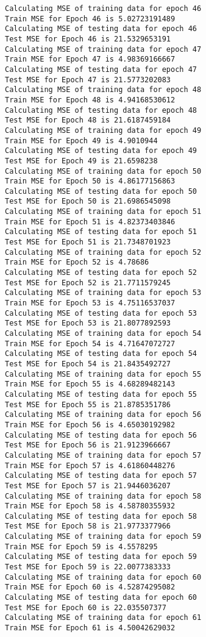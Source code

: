 \documentclass{article}
\begin{document}
\begin{Verbatim}[commandchars=\\\{\}]
Calculating MSE of training data for epoch 46
Train MSE for Epoch 46 is 5.02723191489
Calculating MSE of testing data for epoch 46
Test MSE for Epoch 46 is 21.5329653191
Calculating MSE of training data for epoch 47
Train MSE for Epoch 47 is 4.98369166667
Calculating MSE of testing data for epoch 47
Test MSE for Epoch 47 is 21.5773202083
Calculating MSE of training data for epoch 48
Train MSE for Epoch 48 is 4.94168530612
Calculating MSE of testing data for epoch 48
Test MSE for Epoch 48 is 21.6187459184
Calculating MSE of training data for epoch 49
Train MSE for Epoch 49 is 4.9010944
Calculating MSE of testing data for epoch 49
Test MSE for Epoch 49 is 21.6598238
Calculating MSE of training data for epoch 50
Train MSE for Epoch 50 is 4.86177156863
Calculating MSE of testing data for epoch 50
Test MSE for Epoch 50 is 21.6986545098
Calculating MSE of training data for epoch 51
Train MSE for Epoch 51 is 4.82373403846
Calculating MSE of testing data for epoch 51
Test MSE for Epoch 51 is 21.7348701923
Calculating MSE of training data for epoch 52
Train MSE for Epoch 52 is 4.78686
Calculating MSE of testing data for epoch 52
Test MSE for Epoch 52 is 21.7711579245
Calculating MSE of training data for epoch 53
Train MSE for Epoch 53 is 4.75116537037
Calculating MSE of testing data for epoch 53
Test MSE for Epoch 53 is 21.8077892593
Calculating MSE of training data for epoch 54
Train MSE for Epoch 54 is 4.71647072727
Calculating MSE of testing data for epoch 54
Test MSE for Epoch 54 is 21.8435492727
Calculating MSE of training data for epoch 55
Train MSE for Epoch 55 is 4.68289482143
Calculating MSE of testing data for epoch 55
Test MSE for Epoch 55 is 21.8785351786
Calculating MSE of training data for epoch 56
Train MSE for Epoch 56 is 4.65030192982
Calculating MSE of testing data for epoch 56
Test MSE for Epoch 56 is 21.9123966667
Calculating MSE of training data for epoch 57
Train MSE for Epoch 57 is 4.61860448276
Calculating MSE of testing data for epoch 57
Test MSE for Epoch 57 is 21.9446036207
Calculating MSE of training data for epoch 58
Train MSE for Epoch 58 is 4.58780355932
Calculating MSE of testing data for epoch 58
Test MSE for Epoch 58 is 21.9773377966
Calculating MSE of training data for epoch 59
Train MSE for Epoch 59 is 4.5578295
Calculating MSE of testing data for epoch 59
Test MSE for Epoch 59 is 22.0077383333
Calculating MSE of training data for epoch 60
Train MSE for Epoch 60 is 4.52874295082
Calculating MSE of testing data for epoch 60
Test MSE for Epoch 60 is 22.035507377
Calculating MSE of training data for epoch 61
Train MSE for Epoch 61 is 4.50042629032

\end{Verbatim}
\end{document}
